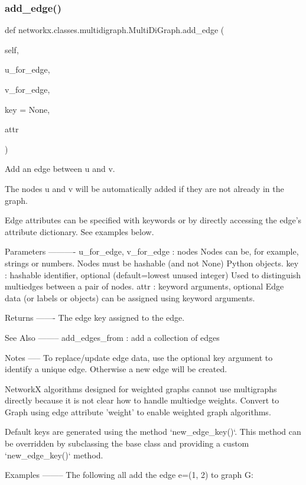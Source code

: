 \subsubsection{\texorpdfstring{add\+\_\+edge()}{add\_edge()}}
{\footnotesize\ttfamily def networkx.\+classes.\+multidigraph.\+Multi\+Di\+Graph.\+add\+\_\+edge (\begin{DoxyParamCaption}\item[{}]{self,  }\item[{}]{u\+\_\+for\+\_\+edge,  }\item[{}]{v\+\_\+for\+\_\+edge,  }\item[{}]{key = {\ttfamily None},  }\item[{}]{attr }\end{DoxyParamCaption})}

\begin{DoxyVerb}Add an edge between u and v.

The nodes u and v will be automatically added if they are
not already in the graph.

Edge attributes can be specified with keywords or by directly
accessing the edge's attribute dictionary. See examples below.

Parameters
----------
u_for_edge, v_for_edge : nodes
    Nodes can be, for example, strings or numbers.
    Nodes must be hashable (and not None) Python objects.
key : hashable identifier, optional (default=lowest unused integer)
    Used to distinguish multiedges between a pair of nodes.
attr : keyword arguments, optional
    Edge data (or labels or objects) can be assigned using
    keyword arguments.

Returns
-------
The edge key assigned to the edge.

See Also
--------
add_edges_from : add a collection of edges

Notes
-----
To replace/update edge data, use the optional key argument
to identify a unique edge.  Otherwise a new edge will be created.

NetworkX algorithms designed for weighted graphs cannot use
multigraphs directly because it is not clear how to handle
multiedge weights.  Convert to Graph using edge attribute
'weight' to enable weighted graph algorithms.

Default keys are generated using the method `new_edge_key()`.
This method can be overridden by subclassing the base class and
providing a custom `new_edge_key()` method.

Examples
--------
The following all add the edge e=(1, 2) to graph G:


\end{DoxyVerb}

